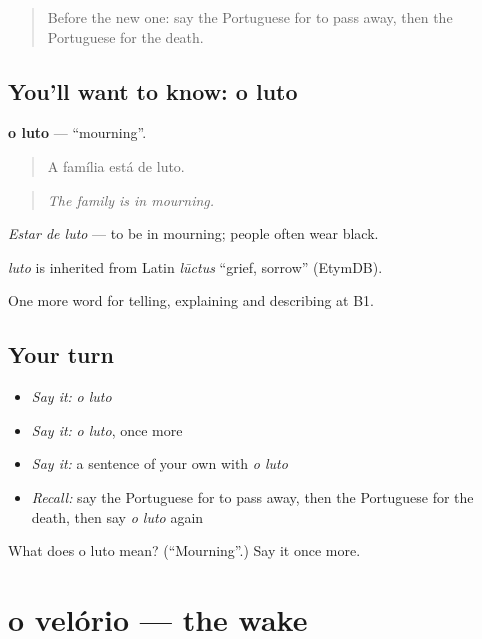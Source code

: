 \begin{quote}
Before the new one: say the Portuguese for to pass away, then the Portuguese for the death.
\end{quote}

\subsection*{You'll want to know: o luto}
\textbf{o luto} — \textquotedblleft{}mourning\textquotedblright{}.

\begin{quote}
A família está de luto.
\end{quote}

\begin{quote}
\emph{The family is in mourning.}
\end{quote}

\emph{Estar de luto} — to be in mourning; people often wear black.

\begin{cousinweb}
\emph{luto} is inherited from Latin \emph{lūctus} \textquotedblleft{}grief, sorrow\textquotedblright{} (EtymDB).
\end{cousinweb}

\begin{grammarlens}[title={What you've built}]
One more word for telling, explaining and describing at B1.
\end{grammarlens}

\subsection*{Your turn}
\begin{itemize}
\raggedright
  \item \emph{Say it:} \emph{o luto}
  \item \emph{Say it:} \emph{o luto}, once more
  \item \emph{Say it:} a sentence of your own with \emph{o luto}
  \item \emph{Recall:} say the Portuguese for to pass away, then the Portuguese for the death, then say \emph{o luto} again
\end{itemize}

\begin{tcolorbox}[breakable,colback=teal!4,colframe=teal!35!black,title={Before you move on}]
What does o luto mean? (\textquotedblleft{}Mourning\textquotedblright{}.) Say it once more.
\end{tcolorbox}
\section[o velório]{o velório — the wake}

